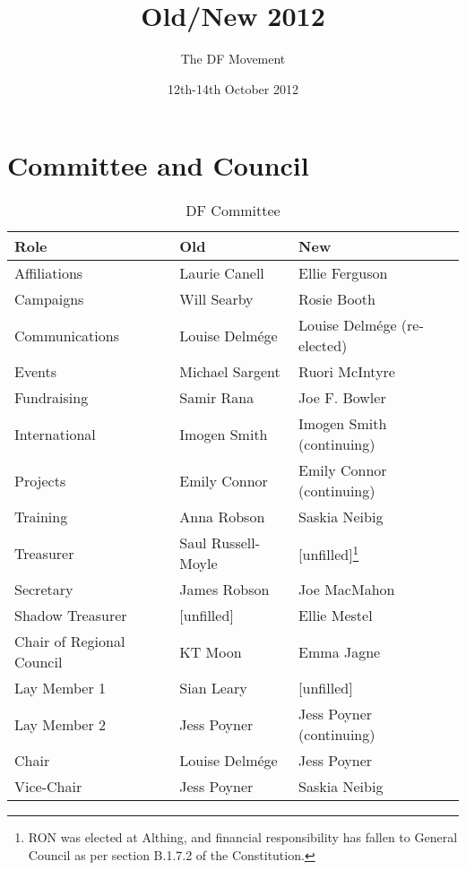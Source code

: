 \documentclass[a4paper, 12pt]{article}
\title{Old/New 2012}
\author{The DF Movement}
\date{12th-14th October 2012}
\begin{document}
\maketitle
\tableofcontents

\clearpage

\section{Committee and Council}
\begin{savenotes}
\begin{table}[h]
\centering

\begin{tabular}{ l || l | l }
\textbf{Role}				& \textbf{Old}			& \textbf{New} \\ \hline
Affiliations				& Laurie Canell			& Ellie Ferguson \\
Campaigns					& Will Searby			& Rosie Booth \\
Communications				& Louise Delmége		& Louise Delmége (re-elected) \\
Events						& Michael Sargent		& Ruori McIntyre \\
Fundraising					& Samir Rana			& Joe F. Bowler \\
International				& Imogen Smith			& Imogen Smith (continuing) \\
Projects					& Emily Connor			& Emily Connor (continuing) \\
Training					& Anna Robson			& Saskia Neibig \\
Treasurer					& Saul Russell-Moyle	& [unfilled]\footnote{RON was elected at Althing, and financial responsibility has fallen to General Council as per section B.1.7.2 of the Constitution.} \\
Secretary					& James Robson			& Joe MacMahon \\
Shadow Treasurer			& [unfilled]			& Ellie Mestel \\
Chair of Regional Council	& KT Moon				& Emma Jagne \\
Lay Member 1				& Sian Leary			& [unfilled] \\
Lay Member 2				& Jess Poyner			& Jess Poyner (continuing) \\
Chair						& Louise Delmége		& Jess Poyner \\
Vice-Chair					& Jess Poyner			& Saskia Neibig \\
\end{tabular}
\caption{DF Committee}
\end{table}
\end{savenotes}
\end{document}
